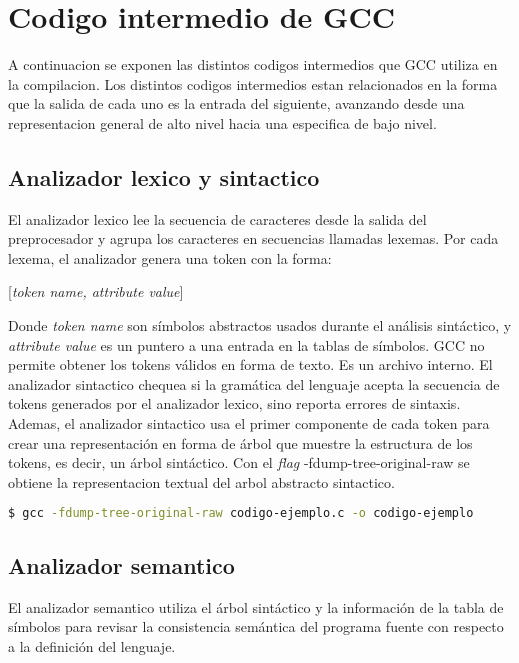 \chapter{Codigo intermedio de GCC}

A continuacion se exponen las distintos codigos intermedios que GCC utiliza en la compilacion. 
Los distintos codigos intermedios estan relacionados en la forma que la salida 
de cada uno es la entrada del siguiente, avanzando desde una representacion general de alto nivel 
hacia una especifica de bajo nivel. 

\section{Analizador lexico y sintactico}
El analizador lexico lee la secuencia de caracteres desde la salida del preprocesador y agrupa los 
caracteres en secuencias llamadas lexemas.
Por cada lexema, el analizador genera una token con la forma:
\begin{center}
    [\emph{token name, attribute value}]
\end{center}
Donde \emph{token name} son símbolos abstractos usados durante el análisis sintáctico,
y \emph{attribute value} es un puntero a una entrada en la tablas de símbolos.
GCC no permite obtener los tokens válidos en forma de texto. Es un archivo interno.
El analizador sintactico chequea si la gramática del lenguaje acepta la secuencia
de tokens generados por el analizador lexico, sino reporta errores de sintaxis. 
Ademas, el analizador sintactico usa el primer componente de cada token para crear una representación en forma de árbol 
que muestre la estructura de los tokens, es decir, un árbol sintáctico.
Con el \emph{flag} -fdump-tree-original-raw se obtiene la representacion textual del arbol abstracto sintactico.

\begin{lstlisting}[label=comandoC, caption= Comando de compilación del archivo codigo-ejemplo.c \cite{repositorio} para GCC., language=bash]
    $ gcc -fdump-tree-original-raw codigo-ejemplo.c -o codigo-ejemplo  \end{lstlisting}

\section{Analizador semantico}
El analizador semantico utiliza el árbol sintáctico y la información de la tabla de símbolos 
para revisar la consistencia semántica del programa fuente con respecto a la definición del lenguaje. 

